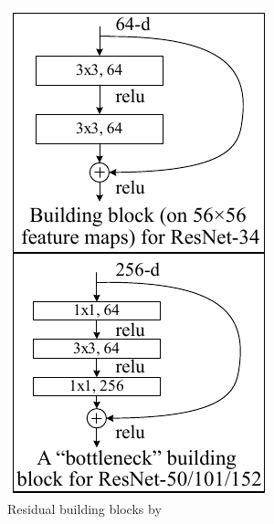 \begin{minipage}[ht]{.32\textwidth}
    \begin{figure}[H]
        \centering
    \includegraphics[width=.99\textwidth]{literature/imgs/ext-CNN-ResNet-BBs.pdf}
    \caption{Residual building blocks by \citet{he2015deep}}
    \label{fig:ext-CNN-ResNet-BBs}
    \end{figure}
\end{minipage}
